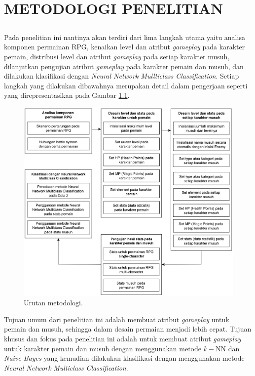 \chapter{METODOLOGI PENELITIAN}
\label{chap:chap3_metodologi}

\section*{}
Pada penelitian ini nantinya akan terdiri dari lima langkah utama yaitu analisa komponen permainan RPG, kenaikan level dan atribut \textit{gameplay} pada karakter pemain, distribusi level dan atribut \textit{gameplay} pada setiap karakter musuh, dilanjutkan pengujian atribut \textit{gameplay} pada karakter pemain dan musuh, dan dilakukan klasifikasi dengan \textit{Neural Network Mullticlass Classification}. Setiap langkah yang dilakukan dibawahnya merupakan detail dalam pengerjaan seperti yang direpresentasikan pada Gambar \ref{fig:metodologi}.
\vspace{1ex}

\begin{figure} [!h] \centering
	\includegraphics[scale=0.12]{img/metodologi_5.png}
	\caption{Urutan metodologi.}
	\label{fig:metodologi}
\end{figure}
\vspace{1ex}

Tujuan umum dari penelitian ini adalah membuat atribut \textit{gameplay} untuk pemain dan musuh, sehingga dalam desain permaian menjadi lebih cepat. Tujuan khusus dan fokus pada penelitian ini adalah untuk membuat atribut \textit{gameplay} untuk karakter pemain dan musuh dengan menggunakan metode $k-$NN dan \textit{Naive Bayes} yang kemudian dilakukan klasifikasi dengan menggunakan metode \textit{Neural Network} \textit{Multiclass Classification}.
\vspace{1ex}

